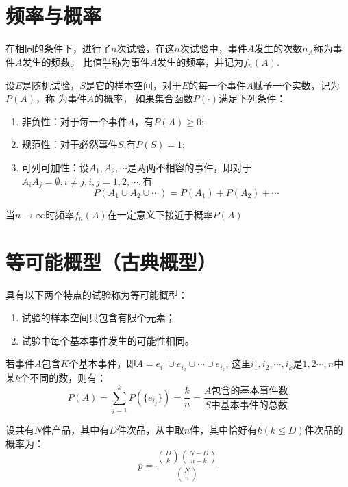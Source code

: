 \section{频率与概率}
\begin{definition}[频率]
  在相同的条件下，进行了$n$次试验，在这$n$次试验中，事件$A$发生的次数$n_A$称为事件$A$发生的频数。
  比值$\frac{n_A}{n}$称为事件$A$发生的频率，并记为$f_n(A)$. 
\end{definition}


\begin{definition}[概率]
  设$E$是随机试验，$S$是它的样本空间，对于$E$的每一个事件$A$赋予一个实数，记为$P(A)$，称
  为事件$A$的概率，
  如果集合函数$P(\cdot)$满足下列条件：
  \begin{enumerate}
    \item {\heiti 非负性：}对于每一个事件$A$，有$P(A)\geq 0$;
    \item {\heiti 规范性：}对于必然事件$S$,有$P(S)=1$;
    \item {\heiti 可列可加性：}设$A_1,A_2,\cdots$是两两不相容的事件，即对于$A_iA_j=\emptyset,i\neq j,i,j=1,2,\cdots,$有
    $$P(A_1\cup A_2\cup\cdots)=P(A_1)+P(A_2)+\cdots$$
  \end{enumerate}
  当$n\to \infty$时频率$f_n(A)$在一定意义下接近于概率$P(A)$
\end{definition}

\section{等可能概型（古典概型）}
\begin{definition}[等可能概型]
  具有以下两个特点的试验称为等可能概型：
  \begin{enumerate}
    \item 试验的样本空间只包含有限个元素；
    \item 试验中每个基本事件发生的可能性相同。
  \end{enumerate}
\end{definition}

\begin{theorem}
  若事件$A$包含$K$个基本事件，即$A={e_{i_1}}\cup{e_{i_2}}\cup\cdots\cup{e_{i_k}}$,
  这里$i_1,i_2,\cdots,i_k$是$1,2\cdots,n$中某$k$个不同的数，则有：
  $$P(A)=\sum_{j = 1}^{k}P(\{e_{i_j}\})=\frac{k}{n}=\frac{A\mbox{包含的基本事件数}}{S\mbox{中基本事件的总数}}$$  
\end{theorem}

\begin{theorem}[超几何分布的概率公式]
  设共有$N$件产品，其中有$D$件次品，从中取$n$件，其中恰好有$k(k\leq D)$件次品的概率为：
  $$p=\frac{\binom{D}{k}\binom{N-D}{n-k}}{\binom{N}{n} }$$
\end{theorem}

